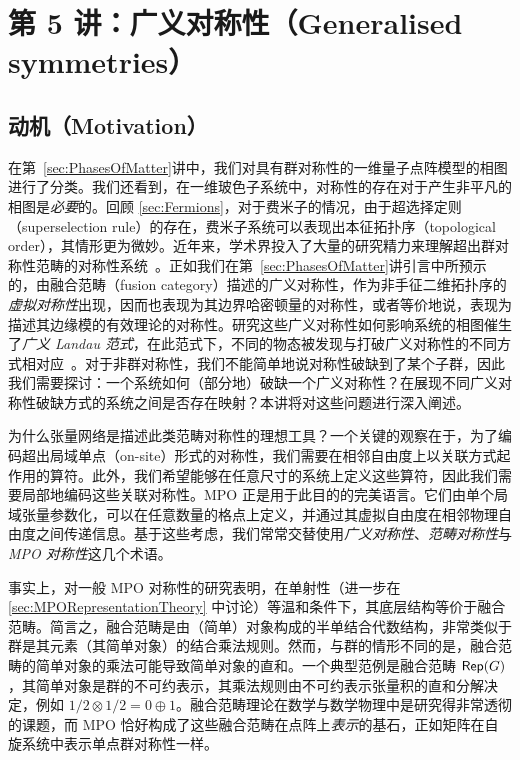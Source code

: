 \section{第 5 讲：广义对称性（Generalised symmetries）}\label{sec:GenSym}
\subsection{动机（Motivation）}
在第~\ref{sec:PhasesOfMatter}讲中，我们对具有群对称性的一维量子点阵模型的相图进行了分类。我们还看到，在一维玻色子系统中，对称性的存在对于产生非平凡的相图是\emph{必要}的。回顾 \cref{sec:Fermions}，对于费米子的情况，由于超选择定则（superselection rule）的存在，费米子系统可以表现出本征拓扑序（topological order），其情形更为微妙。近年来，学术界投入了大量的研究精力来理解超出群对称性范畴的对称性系统~\cite{Gaiotto2014,Thorngren2019,Aasen2020,Komargodski2020,McGreevy2022,Moradi2022,Freed2022,Shao2023,Schafer-Nameki2023,Moradi2023,Bhardwaj2023}。正如我们在第~\ref{sec:PhasesOfMatter}讲引言中所预示的，由融合范畴（fusion category）描述的广义对称性，作为非手征二维拓扑序的\emph{虚拟对称性}出现，因而也表现为其边界哈密顿量的对称性，或者等价地说，表现为描述其边缘模的有效理论的对称性。研究这些广义对称性如何影响系统的相图催生了\emph{广义 Landau 范式}，在此范式下，不同的物态被发现与打破广义对称性的不同方式相对应~\cite{Thorngren2019,Moradi2022,Bhardwaj2023,Lootens2024,Chen2025}。对于非群对称性，我们不能简单地说对称性破缺到了某个子群，因此我们需要探讨：一个系统如何（部分地）破缺一个广义对称性？在展现不同广义对称性破缺方式的系统之间是否存在映射？本讲将对这些问题进行深入阐述。

为什么张量网络是描述此类范畴对称性的理想工具？一个关键的观察在于，为了编码超出局域单点（on-site）形式的对称性，我们需要在相邻自由度上以关联方式起作用的算符。此外，我们希望能够在任意尺寸的系统上定义这些算符，因此我们需要局部地编码这些关联对称性。MPO 正是用于此目的的完美语言。它们由单个局域张量参数化，可以在任意数量的格点上定义，并通过其虚拟自由度在相邻物理自由度之间传递信息。基于这些考虑，我们常常交替使用\emph{广义对称性}、\emph{范畴对称性}与 \emph{MPO 对称性}这几个术语。

事实上，对一般 MPO 对称性的研究表明，在单射性（进一步在 \cref{sec:MPORepresentationTheory} 中讨论）等温和条件下，其底层结构等价于融合范畴。简言之，融合范畴是由（简单）对象构成的半单结合代数结构，非常类似于群是其元素（其简单对象）的结合乘法规则。然而，与群的情形不同的是，融合范畴的简单对象的乘法可能导致简单对象的直和。一个典型范例是融合范畴 $\mathsf{Rep}(G)$，其简单对象是群的不可约表示，其乘法规则由不可约表示张量积的直和分解决定，例如 $1/2\otimes 1/2=0\oplus 1$。融合范畴理论在数学与数学物理中是研究得非常透彻的课题，而 MPO 恰好构成了这些融合范畴在点阵上\emph{表示}的基石，正如矩阵在自旋系统中表示单点群对称性一样。

